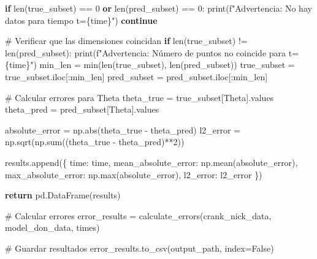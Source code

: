 \documentclass[
  spanish,
  us-letterpaper,
  DIV=11,
  numbers=noendperiod]{scrreprt}
\newenvironment{Shaded}{\begin{snugshade}}{\end{snugshade}}
\newcommand{\BuiltInTok}[1]{\textcolor[rgb]{0.00,0.23,0.31}{#1}}
\newcommand{\CommentTok}[1]{\textcolor[rgb]{0.37,0.37,0.37}{#1}}
\newcommand{\ControlFlowTok}[1]{\textcolor[rgb]{0.00,0.23,0.31}{\textbf{#1}}}
\newcommand{\DecValTok}[1]{\textcolor[rgb]{0.68,0.00,0.00}{#1}}
\newcommand{\KeywordTok}[1]{\textcolor[rgb]{0.00,0.23,0.31}{\textbf{#1}}}
\newcommand{\NormalTok}[1]{\textcolor[rgb]{0.00,0.23,0.31}{#1}}
\newcommand{\OperatorTok}[1]{\textcolor[rgb]{0.37,0.37,0.37}{#1}}
\newcommand{\SpecialCharTok}[1]{\textcolor[rgb]{0.37,0.37,0.37}{#1}}
\newcommand{\SpecialStringTok}[1]{\textcolor[rgb]{0.13,0.47,0.30}{#1}}
\newcommand{\StringTok}[1]{\textcolor[rgb]{0.13,0.47,0.30}{#1}}
\newcommand{\VariableTok}[1]{\textcolor[rgb]{0.07,0.07,0.07}{#1}}
\theoremstyle{definition}
\theoremstyle{plain}
\theoremstyle{remark}
\begin{document}
\begin{Shaded}
\begin{Highlighting}[]
        \ControlFlowTok{if} \BuiltInTok{len}\NormalTok{(true\_subset) }\OperatorTok{==} \DecValTok{0} \KeywordTok{or} \BuiltInTok{len}\NormalTok{(pred\_subset) }\OperatorTok{==} \DecValTok{0}\NormalTok{:}
            \BuiltInTok{print}\NormalTok{(}\SpecialStringTok{f"Advertencia: No hay datos para tiempo t=}\SpecialCharTok{\{}\NormalTok{time}\SpecialCharTok{\}}\SpecialStringTok{"}\NormalTok{)}
            \ControlFlowTok{continue}
        
        \CommentTok{\# Verificar que las dimensiones coincidan}
        \ControlFlowTok{if} \BuiltInTok{len}\NormalTok{(true\_subset) }\OperatorTok{!=} \BuiltInTok{len}\NormalTok{(pred\_subset):}
            \BuiltInTok{print}\NormalTok{(}\SpecialStringTok{f"Advertencia: Número de puntos no coincide para t=}\SpecialCharTok{\{}\NormalTok{time}\SpecialCharTok{\}}\SpecialStringTok{"}\NormalTok{)}
\NormalTok{            min\_len }\OperatorTok{=} \BuiltInTok{min}\NormalTok{(}\BuiltInTok{len}\NormalTok{(true\_subset), }\BuiltInTok{len}\NormalTok{(pred\_subset))}
\NormalTok{            true\_subset }\OperatorTok{=}\NormalTok{ true\_subset.iloc[:min\_len]}
\NormalTok{            pred\_subset }\OperatorTok{=}\NormalTok{ pred\_subset.iloc[:min\_len]}
        
        \CommentTok{\# Calcular errores para Theta}
\NormalTok{        theta\_true }\OperatorTok{=}\NormalTok{ true\_subset[}\StringTok{\textquotesingle{}Theta\textquotesingle{}}\NormalTok{].values}
\NormalTok{        theta\_pred }\OperatorTok{=}\NormalTok{ pred\_subset[}\StringTok{\textquotesingle{}Theta\textquotesingle{}}\NormalTok{].values}
        
\NormalTok{        absolute\_error }\OperatorTok{=}\NormalTok{ np.}\BuiltInTok{abs}\NormalTok{(theta\_true }\OperatorTok{{-}}\NormalTok{ theta\_pred)}
\NormalTok{        l2\_error }\OperatorTok{=}\NormalTok{ np.sqrt(np.}\BuiltInTok{sum}\NormalTok{((theta\_true }\OperatorTok{{-}}\NormalTok{ theta\_pred)}\OperatorTok{**}\DecValTok{2}\NormalTok{))}
        
\NormalTok{        results.append(\{}
            \StringTok{\textquotesingle{}time\textquotesingle{}}\NormalTok{: time,}
            \StringTok{\textquotesingle{}mean\_absolute\_error\textquotesingle{}}\NormalTok{: np.mean(absolute\_error),}
            \StringTok{\textquotesingle{}max\_absolute\_error\textquotesingle{}}\NormalTok{: np.}\BuiltInTok{max}\NormalTok{(absolute\_error),}
            \StringTok{\textquotesingle{}l2\_error\textquotesingle{}}\NormalTok{: l2\_error}
\NormalTok{        \})}
    
    \ControlFlowTok{return}\NormalTok{ pd.DataFrame(results)}

\CommentTok{\# Calcular errores}
\NormalTok{error\_results }\OperatorTok{=}\NormalTok{ calculate\_errors(crank\_nick\_data, model\_don\_data, times)}

\CommentTok{\# Guardar resultados}
\NormalTok{error\_results.to\_csv(output\_path, index}\OperatorTok{=}\VariableTok{False}\NormalTok{)}
\end{Highlighting}
\end{Shaded}
\end{document}
